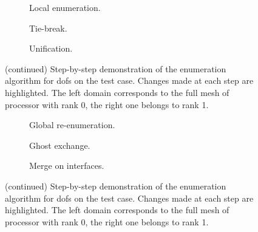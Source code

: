 {%
\let\oldthesubfigure\thesubfigure
\renewcommand{\thesubfigure}{Phase \arabic{subfigure}}

\def\Length{1}
\def\Radius{0.03}

\begin{figure}
\centering
\begin{subfigure}{\textwidth}
  \resizebox{\textwidth}{!}{
    
    \hfill{}
    
  }
  \caption{Local enumeration.}
\end{subfigure}
\begin{subfigure}{\textwidth}
  \resizebox{\textwidth}{!}{
    
    \hfill{}
    
  }
  \caption{Tie-break.}
\end{subfigure}
\begin{subfigure}{\textwidth}
  \resizebox{\textwidth}{!}{
    
    \hfill{}
    
  }
  \caption{Unification.}
\end{subfigure}
\caption[]{(continued) Step-by-step demonstration of the enumeration algorithm for \glspl{dof} on the test case. Changes made at each step are highlighted. The left domain corresponds to the full mesh of processor with rank 0, the right one belongs to rank 1.}
\end{figure}

\begin{figure}
\ContinuedFloat
\begin{subfigure}{\textwidth}
  \resizebox{\textwidth}{!}{
    
    \hfill{}
    
  }
  \caption{Global re-enumeration.}
\end{subfigure}
\begin{subfigure}{\textwidth}
  \resizebox{\textwidth}{!}{
    
    \hfill{}
    
  }
  \caption{Ghost exchange.}
\end{subfigure}
\begin{subfigure}{\textwidth}
  \resizebox{\textwidth}{!}{
    
    \hfill{}
    
  }
  \caption{Merge on interfaces.}
\end{subfigure}
\caption[]{(continued) Step-by-step demonstration of the enumeration algorithm for \glspl{dof} on the test case. Changes made at each step are highlighted. The left domain corresponds to the full mesh of processor with rank 0, the right one belongs to rank 1.}
\end{figure}

\renewcommand{\thesubfigure}{\oldthesubfigure}
}
